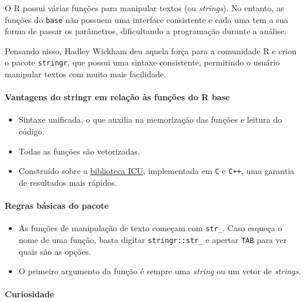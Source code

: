 \documentclass[
]{book}
\begin{document}
O R possui várias funções para manipular textos (ou \emph{strings}). No entanto, as funções do \texttt{base} não possuem uma interface consistente e cada uma tem a sua forma de passar os parâmetros, dificultando a programação durante a análise.

Pensando nisso, Hadley Wickham deu aquela força para a comunidade R e criou o pacote \texttt{stringr}, que possui uma sintaxe consistente, permitindo o usuário manipular textos com muito mais facilidade.

\hypertarget{vantagens-do-stringr-em-relauxe7uxe3o-uxe0s-funuxe7uxf5es-do-r-base}{%
\paragraph*{Vantagens do stringr em relação às funções do R base}\label{vantagens-do-stringr-em-relauxe7uxe3o-uxe0s-funuxe7uxf5es-do-r-base}}

\begin{itemize}
\item
  Sintaxe unificada, o que auxilia na memorização das funções e leitura do código.
\item
  Todas as funções são vetorizadas.
\item
  Construído sobre a \href{http://site.icu-project.org/}{biblioteca ICU}, implementada em \texttt{C} e \texttt{C++}, uma garantia de resultados mais rápidos.
\end{itemize}

\hypertarget{regras-buxe1sicas-do-pacote}{%
\paragraph*{Regras básicas do pacote}\label{regras-buxe1sicas-do-pacote}}

\begin{itemize}
\item
  As funções de manipulação de texto começam com \texttt{str\_}. Caso esqueça o nome de uma função, basta digitar \texttt{stringr::str\_} e apertar \texttt{TAB} para ver quais são as opções.
\item
  O primeiro argumento da função é sempre uma \emph{string} ou um vetor de \emph{strings}.
\end{itemize}

\hypertarget{curiosidade}{%
\paragraph*{Curiosidade}\label{curiosidade}}
\end{document}
